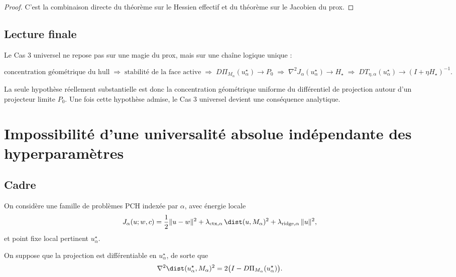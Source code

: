 \begin{proof}
C'est la combinaison directe du théorème sur le Hessien effectif et du théorème sur le Jacobien du prox.
\end{proof}

\subsection{Lecture finale}

Le Cas 3 universel ne repose pas sur une magie du prox, mais sur une chaîne logique unique :

\[
\text{concentration géométrique du hull}
\;\Longrightarrow\;
\text{stabilité de la face active}
\;\Longrightarrow\;
D\Pi_{M_\alpha}(u_\alpha^\star)\to P_0
\;\Longrightarrow\;
\nabla^2 J_\alpha(u_\alpha^\star)\to H_\star
\;\Longrightarrow\;
DT_{\eta,\alpha}(u_\alpha^\star)\to (I+\eta H_\star)^{-1}.
\]

La seule hypothèse réellement substantielle est donc la concentration géométrique uniforme du différentiel de projection autour d'un projecteur limite \(P_0\).
Une fois cette hypothèse admise, le Cas 3 universel devient une conséquence analytique.





\section{Impossibilité d'une universalité absolue indépendante des hyperparamètres}

\subsection{Cadre}

On considère une famille de problèmes PCH indexée par \(\alpha\), avec énergie locale
\[
J_\alpha(u;w,c)
=
\frac12\|u-w\|^2
+
\lambda_{\mathrm{ctx},\alpha}\,\dist(u,M_\alpha)^2
+
\lambda_{\mathrm{ridge},\alpha}\,\|u\|^2,
\]
et point fixe local pertinent \(u_\alpha^\star\).

On suppose que la projection est différentiable en \(u_\alpha^\star\), de sorte que
\[
\nabla^2 \dist(u_\alpha^\star,M_\alpha)^2
=
2\bigl(I-D\Pi_{M_\alpha}(u_\alpha^\star)\bigr).
\]

